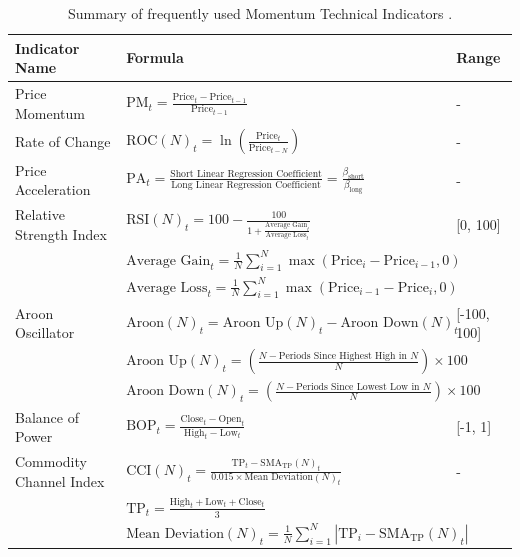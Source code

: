 \begin{table}[htb!]
\centering
\footnotesize
\caption{Summary of frequently used Momentum Technical Indicators \cite{jansen_machine_2020}.}
\label{Tables:MomentumIndicators}
\begin{tabularx}{\textwidth}{@{}lXl@{}}
\toprule
\textbf{Indicator Name} & \textbf{Formula} & \textbf{Range} \\
\midrule
Price Momentum & $\text{PM}_t = \frac{\text{Price}_t - \text{Price}_{t-1}}{\text{Price}_{t-1}}$ & - \\
\addlinespace
Rate of Change & $\text{ROC}(N)_t = \ln\left(\frac{\text{Price}_t}{\text{Price}_{t-N}}\right)$ & - \\
\addlinespace
Price Acceleration & $\text{PA}_t = \frac{\text{Short Linear Regression Coefficient}}{\text{Long Linear Regression Coefficient}} = \frac{\beta_\text{short}}{\beta_\text{long}}$ & - \\
\addlinespace
Relative Strength Index & $\text{RSI}(N)_t = 100 - \frac{100}{1 + \frac{\text{Average Gain}_t}{\text{Average Loss}_t}}$ & [0, 100] \\
\addlinespace
& $\text{Average Gain}_t = \frac{1}{N}\sum_{i=1}^{N} \max(\text{Price}_i - \text{Price}_{i-1}, 0)$ & \\
\addlinespace
& $\text{Average Loss}_t = \frac{1}{N}\sum_{i=1}^{N} \max(\text{Price}_{i-1} - \text{Price}_i, 0)$ & \\
\addlinespace
Aroon Oscillator & $\text{Aroon}(N)_t = \text{Aroon Up}(N)_t - \text{Aroon Down}(N)_t$ & [-100, 100] \\
\addlinespace
& $\text{Aroon Up}(N)_t = \left( \frac{N - \text{Periods Since Highest High in } N}{N} \right) \times 100$ & \\
\addlinespace
& $\text{Aroon Down}(N)_t = \left( \frac{N - \text{Periods Since Lowest Low in } N}{N} \right) \times 100$ & \\
\addlinespace
Balance of Power & $\text{BOP}_t = \frac{\text{Close}_t - \text{Open}_t}{\text{High}_t - \text{Low}_t}$ & [-1, 1] \\
\addlinespace
Commodity Channel Index & $\text{CCI}(N)_t = \frac{\text{TP}_t - \text{SMA}_\text{TP}(N)_t}{0.015 \times \text{Mean Deviation}(N)_t}$ & - \\
\addlinespace
& $\text{TP}_t = \frac{\text{High}_t + \text{Low}_t + \text{Close}_t}{3}$ & \\
\addlinespace
& $\text{Mean Deviation}(N)_t = \frac{1}{N}\sum_{i=1}^{N} |\text{TP}_i - \text{SMA}_\text{TP}(N)_t|$ & \\

\end{tabularx}
\end{table}
